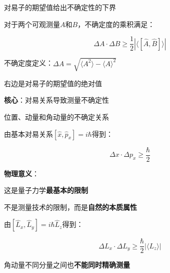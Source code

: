 \begin{frame}{对易子的期望值给出不确定性的下界}
  
    \begin{iqbitemize}
    \item 对于两个可观测量$A$和$B$，不确定度的乘积满足：
    \end{iqbitemize}
      \[
        \Delta A \cdot \Delta B \geq \dfrac{1}{2}\left|\langle[\hat{A}, \hat{B}]\rangle\right|
      \]
    \begin{iqbitemize}
    \item 不确定度定义：$\Delta A = \sqrt{\langle A^2\rangle - \langle A\rangle^2}$
    \item 右边是对易子的期望值的绝对值
    \item \textbf{核心}：对易关系导致测量不确定性
    \end{iqbitemize}
    \iqbsmallsep

    \end{frame}

\begin{frame}{位置、动量和角动量的不确定关系}
  
    \begin{iqbitemize}
    \item 由基本对易关系$[\hat{x}, \hat{p}_x] = i\hbar$得到：
    \end{iqbitemize}
      \[
        \boxed{\Delta x \cdot \Delta p_x \geq \dfrac{\hbar}{2}}
      \]
    \begin{iqbitemize}
    \item \textbf{物理意义}：
    \item 这是量子力学\textbf{最基本的限制}
    \item 不是测量技术的限制，而是\textbf{自然的本质属性}
    \end{iqbitemize}
    \iqbsmallsep

    \begin{iqbitemize}
    \item 由$[\hat{L}_x, \hat{L}_y] = i\hbar\hat{L}_z$得到：
    \end{iqbitemize}
      \[
        \Delta L_x \cdot \Delta L_y \geq \dfrac{\hbar}{2}|\langle L_z\rangle|
      \]
    \begin{iqbitemize}
    \item 角动量不同分量之间也\textbf{不能同时精确测量}
    \end{iqbitemize}
  
\end{frame}

